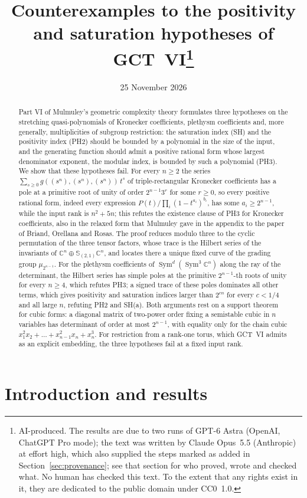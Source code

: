 \documentclass[11pt,a4paper]{article}
\title{Counterexamples to the positivity and saturation hypotheses of GCT~VI\thanks{AI-produced. The results are due to two runs of GPT-6
Astra (OpenAI, ChatGPT Pro mode); the text was written by Claude Opus~5.5
(Anthropic) at effort high, which also supplied the steps marked as added
in Section~\ref{sec:provenance}; see that section for who proved, wrote and
checked what. No human has checked this text. To the extent that any rights
exist in it, they are dedicated to the public domain under CC0~1.0.}}
\author{}
\date{25 November 2026}
\theoremstyle{definition}
\newcommand{\C}{\mathbb{C}}
\newcommand{\Sym}{\operatorname{Sym}}
\begin{document}
\maketitle

\begin{abstract}
Part VI of Mulmuley's geometric complexity theory formulates three hypotheses
on the stretching quasi-polynomials of Kronecker coefficients, plethysm
coefficients and, more generally, multiplicities of subgroup restriction:
the saturation index (SH) and the positivity index (PH2) should be bounded by
a polynomial in the size of the input, and the generating function should
admit a positive rational form whose largest denominator exponent, the modular
index, is bounded by such a polynomial (PH3). We show that these hypotheses
fail. For every $n\ge2$ the series $\sum_{s\ge0}g((s^n),(s^n),(s^n))\,t^s$
of triple-rectangular Kronecker coefficients has a pole at a primitive root of
unity of order $2^{n-1}3^{r}$ for some $r\ge0$, so every positive rational
form, indeed every expression $P(t)/\prod_i(1-t^{a_i})^{b_i}$, has some
$a_i\ge2^{n-1}$, while the input rank is $n^2+5n$; this refutes the existence
clause of PH3 for Kronecker coefficients, also in the relaxed form that
Mulmuley gave in the appendix to the paper of Briand, Orellana and Rosas. The
proof reduces modulo three to the cyclic permutation of the three tensor
factors, whose trace is the Hilbert series of the invariants of
$\C^n\oplus\mathbb S_{(2,1)}\C^n$, and locates there a unique fixed curve of
the grading group $\mu_{2^{n-1}}$. For the plethysm coefficients of
$\Sym^{d}(\Sym^3\C^n)$ along the ray of the determinant, the Hilbert series
has simple poles at the primitive $2^{n-1}$-th roots of unity for every
$n\ge4$, which refutes PH3; a signed trace of these poles dominates all other
terms, which gives positivity and saturation indices larger than $2^{cn}$ for
every $c<1/4$ and all large $n$, refuting PH2 and SH(a). Both arguments rest
on a support theorem for cubic forms: a diagonal matrix of two-power order
fixing a semistable cubic in $n$ variables has determinant of order at most
$2^{n-1}$, with equality only for the chain cubic
$x_1^2x_2+\dots+x_{n-1}^2x_n+x_n^3$. For restriction from a rank-one torus,
which GCT~VI admits as an explicit embedding, the three hypotheses fail at a
fixed input rank.
\end{abstract}

\tableofcontents

\section{Introduction and results}\label{sec:intro}
\end{document}
